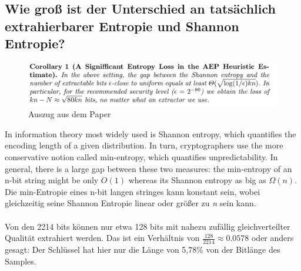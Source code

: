 \subsection{Wie groß ist der Unterschied an tatsächlich extrahierbarer Entropie und Shannon Entropie?}

\begin{figure}[hbt!]
	\centering
		\includegraphics[width=1\textwidth ]
		{Bilder/a5-Corollary1.png}
		\caption{Auszug aus dem Paper}
		\label{fig:5.1}
\end{figure}
\clearpage

\glqq In information theory
most widely used is Shannon entropy, which quantifies 
the encoding length of a given distribution. In turn, 
cryptographers use the more conservative notion
called min-entropy, which quantifies unpredictability. 
In general, there is a large
gap between these two measures: the min-entropy of an 
n-bit string might be only
$O(1)$ whereas its Shannon entropy as big 
as $\Omega (n)$.\grqq \\    

Die min-Entropie eines n-bit langen stringes kann konstant
sein, wobei gleichzeitig seine Shannon Entropie linear oder
größer zu \textit{n} sein kann.\\\\

Von den 2214 bits können nur etwa 128 bits mit nahezu 
zufällig gleichverteilter Qualität extrahiert werden.
Das ist ein Verhältnis von $\frac{128}{2214} ≈ 0.0578$
oder anders gesagt: Der Schlüssel hat hier nur die Länge 
von 5,78\% von der Bitlänge des Samples.


